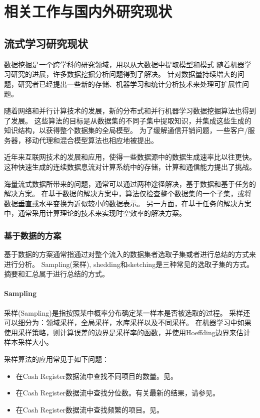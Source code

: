 
\chapter{相关工作与国内外研究现状}
\label{chapter:relate}

\section{流式学习研究现状}

数据挖掘是一个跨学科的研究领域，用以从大数据中提取模型和模式\cite{hand1999statistics, hand2001principles, nialladamsadvances}
随着机器学习研究的进展，许多数据挖掘分析问题得到了解决。 
针对数据量持续增大的问题，研究者已经提出一些新的存储、机器学习和统计分析技术来处理可扩展性问题。

随着网络和并行计算技术的发展，新的分布式和并行机器学习数据挖掘算法也得到了发展。 
这些算法的目标是从数据集的不同子集中提取知识，并集成这些生成的知识结构，以获得整个数据集的全局模型。
为了缓解通信开销问题，一些客户/服务器，移动代理和混合模型算法也相应地被提出\cite{park2002distributed}。

近年来互联网技术的发展和应用，使得一些数据源中的数据生成速率比以往更快。
这种快速生成的连续数据息流对计算系统中的存储，计算和通信能力提出了挑战。

海量流式数据所带来的问题，通常可以通过两种途径解决，基于数据和基于任务的解决方案。 
在基于数据的解决方案中，算法仅检查整个数据集的一个子集，或将数据垂直或水平变换为近似较小的数据表示。
另一方面，在基于任务的解决方案中，通常采用计算理论的技术来实现时空效率的解决方案。

\subsection{基于数据的方案}
基于数据的方案通常指通过对整个流入的数据集者选取子集或者进行总结的方式来进行分析。
Sampling(采样), shedding和sketching是三种常见的选取子集的方式。摘要和汇总属于进行总结的方式。

\subsubsection{Sampling}
采样(Sampling)是指按照某中概率分布确定某一样本是否被选取的过程。
采样还可以细分为：领域采样，全局采样，水库采样以及不同采样。
在机器学习中如果使用采样策略，则计算误差的边界是采样率的函数，并使用Hoeffding边界来估计样本采样大小\cite{domingos2001general}。

采样算法的应用常见于如下问题：
\begin{itemize}
\item 在Cash Register数据流中查找不同项目的数量。见\cite{gibbons2001distinct}。
\item 在Cash Register数据流中查找分位数。有关最新的结果，请参见\cite{greenwald2001space}。
\item 在Cash Register数据流中查找频繁的项目。见\cite{manku2002approximate}。
\end{itemize}
 
